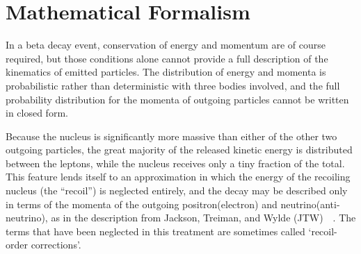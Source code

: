 

\section{Mathematical Formalism}
\label{sec:math_formalism}
		In a beta decay event, conservation of energy and momentum are of course required, but those conditions alone cannot provide a full description of the kinematics of emitted particles.  The distribution of energy and momenta is probabilistic rather than deterministic with three bodies involved, and the full probability distribution for the momenta of outgoing particles cannot be written in closed form.  

Because the nucleus is significantly more massive than either of the other two outgoing particles, the great majority of the released kinetic energy is distributed between the leptons, while the nucleus receives only a tiny fraction of the total.  This feature lends itself to an approximation in which the energy of the recoiling nucleus (the ``recoil'') is neglected entirely, and the decay may be described only in terms of the momenta of the outgoing positron(electron) and neutrino(anti-neutrino), as in the description from Jackson, Treiman, and Wylde (JTW)~\cite{jtw}~\cite{jtw_coulomb}.  The terms that have been neglected in this treatment are sometimes called `recoil-order corrections'.


